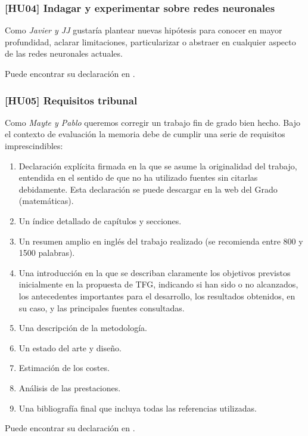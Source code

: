 \subsubsection*{ [HU04] Indagar y experimentar sobre redes neuronales} \label{HUO4}

Como \textit{Javier y JJ} gustaría plantear nuevas hipótesis para conocer en mayor profundidad, 
aclarar limitaciones, particularizar o abstraer en cualquier aspecto de las redes neuronales actuales.

Puede encontrar su declaración en \cite{TFG-Estudio-de-las-redes-neuronales-HU04}.


\subsubsection*{[HU05] Requisitos tribunal} \label{HUO6}
Como \textit{Mayte y Pablo} queremos corregir un trabajo fin de grado bien hecho. 
Bajo el contexto de evaluación la memoria debe de cumplir una serie de requisitos imprescindibles:

\begin{enumerate}
    \item Declaración explícita firmada en la que se asume la originalidad del trabajo, entendida en el sentido de que no ha utilizado fuentes sin citarlas debidamente. Esta declaración se puede descargar en la web del Grado (matemáticas).
    \item Un índice detallado de capítulos y secciones.
    \item Un resumen amplio en inglés del trabajo realizado (se recomienda entre 800 y 1500 palabras).
    \item Una introducción en la que se describan claramente los objetivos previstos inicialmente en la propuesta de TFG, indicando si han sido o no alcanzados, los antecedentes importantes para el desarrollo, los resultados obtenidos, en su caso, y las principales fuentes consultadas.
    \item Una descripción de la metodología.
    \item Un estado del arte y diseño.
    \item Estimación de los costes.
    \item Análisis de las prestaciones.
    \item Una bibliografía final que incluya todas las referencias utilizadas.
\end{enumerate}
Puede encontrar su declaración en \cite{TFG-Estudio-de-las-redes-neuronales-HU06}.


